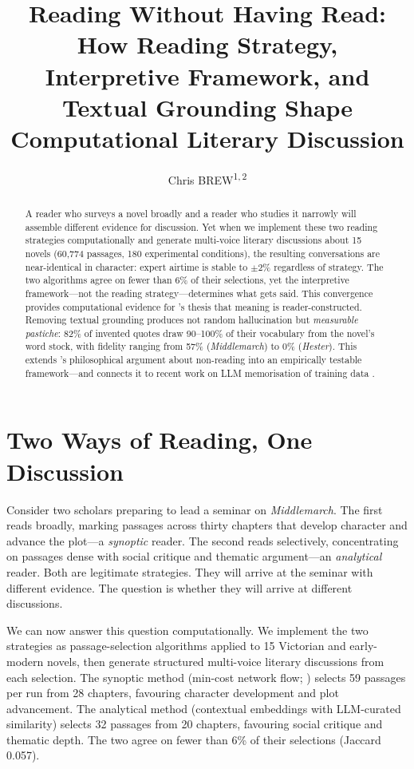 \documentclass{article}
\title{Reading Without Having Read: How Reading Strategy, Interpretive Framework, and Textual Grounding Shape Computational Literary Discussion}
\author{
  Chris BREW\textsuperscript{1,\,2}\orcidlink{0000-0003-3946-4395}
}
\begin{document}
\maketitle

\begin{abstract}
A reader who surveys a novel broadly and a reader who studies it
narrowly will assemble different evidence for discussion.  Yet when we
implement these two reading strategies computationally and generate
multi-voice literary discussions about 15 novels (60,774 passages, 180
experimental conditions), the resulting conversations are
near-identical in character: expert airtime is stable to $\pm$2\%
regardless of strategy.  The two algorithms agree on fewer than 6\% of
their selections, yet the interpretive framework---not the reading
strategy---determines what gets said.  This convergence provides
computational evidence for \textcite{fish1980text}'s thesis that
meaning is reader-constructed.  Removing textual grounding produces not
random hallucination but \emph{measurable pastiche}: 82\% of invented
quotes draw 90--100\% of their vocabulary from the novel's word stock,
with fidelity ranging from 57\% (\emph{Middlemarch}) to 0\%
(\emph{Hester}).  This extends \textcite{bayard2007comment}'s
philosophical argument about non-reading into an empirically testable
framework---and connects it to recent work on LLM memorisation of
training data \parencite{carlini2021extracting, carlini2023quantifying}.
\end{abstract}


\section{Two Ways of Reading, One Discussion}
\label{sec:intro}

Consider two scholars preparing to lead a seminar on
\emph{Middlemarch}.  The first reads broadly, marking passages across
thirty chapters that develop character and advance the plot---a
\emph{synoptic} reader.  The second reads selectively, concentrating
on passages dense with social critique and thematic argument---an
\emph{analytical} reader.  Both are legitimate strategies.  They will
arrive at the seminar with different evidence.  The question is whether
they will arrive at different discussions.

We can now answer this question computationally.  We implement the two
strategies as passage-selection algorithms applied to 15 Victorian and
early-modern novels, then generate structured multi-voice literary
discussions from each selection.  The synoptic method (min-cost network
flow; ) selects 59 passages per run from 28
chapters, favouring character development and plot advancement.  The
analytical method (contextual embeddings with LLM-curated similarity)
selects 32 passages from 20 chapters, favouring social critique and
thematic depth.  The two agree on fewer than 6\% of their selections
(Jaccard 0.057).
\end{document}
